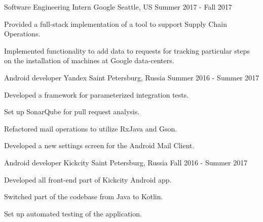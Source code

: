 

\begin{cventries}
  \cventry
    {Software Engineering Intern} %
    {Google} %
    {Seattle, US} %
    {Summer 2017 - Fall 2017} %
    {
      \begin{cvitems} %
        \item {Provided a full-stack implementation of a tool to support Supply Chain Operations.}
        \item {Implemented functionality to add data to requests for tracking particular steps on the installation of machines at Google data-centers. 
}
      \end{cvitems}
    }

  \cventry
    {Android developer} %
    {Yandex} %
    {Saint Petersburg, Russia} %
    {Summer 2016 - Summer 2017} %
    {
      \begin{cvitems} %
        \item {Developed a framework for parameterized integration tests.}
        \item {Set up SonarQube for pull request analysis.}
        \item {Refactored mail operations to utilize RxJava and Gson.}
        \item {Developed a new settings screen for the Android Mail Client.}
      \end{cvitems}
    }

  \cventry
    {Android developer} %
    {Kickcity} %
    {Saint Petersburg, Russia} %
    {Fall 2016 - Summer 2017} %
    {
      \begin{cvitems} %
        \item {Developed all front-end part of Kickcity Android app.}
        \item {Switched part of the codebase from Java to Kotlin.}
        \item {Set up automated testing of the application.}
      \end{cvitems}
    }
\end{cventries}
